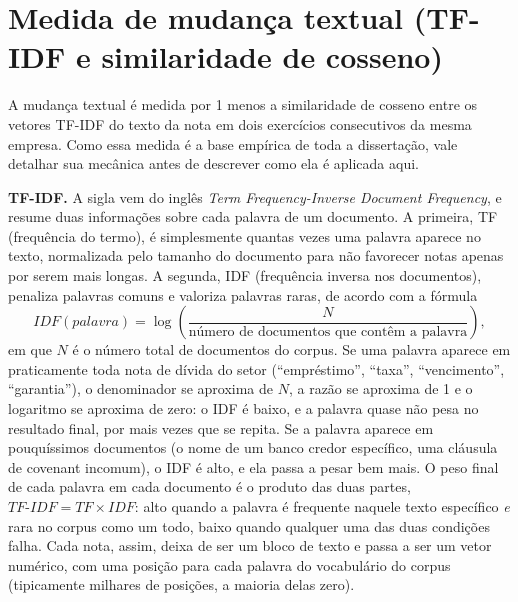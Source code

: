 \documentclass[a4paper,12pt]{report}
\begin{document}
\section{Medida de mudança textual (TF-IDF e similaridade de cosseno)}
\label{sec:medida}

A mudança textual é medida por 1 menos a similaridade de cosseno entre os vetores TF-IDF do texto da nota em dois exercícios consecutivos da mesma empresa. Como essa medida é a base empírica de toda a dissertação, vale detalhar sua mecânica antes de descrever como ela é aplicada aqui.

\textbf{TF-IDF.} A sigla vem do inglês \textit{Term Frequency-Inverse Document Frequency}, e resume duas informações sobre cada palavra de um documento. A primeira, TF (frequência do termo), é simplesmente quantas vezes uma palavra aparece no texto, normalizada pelo tamanho do documento para não favorecer notas apenas por serem mais longas. A segunda, IDF (frequência inversa nos documentos), penaliza palavras comuns e valoriza palavras raras, de acordo com a fórmula
\begin{equation}
    \mathit{IDF}(palavra) = \log\left(\frac{N}{\text{número de documentos que contêm a palavra}}\right),
    \label{eq:idf}
\end{equation}
em que $N$ é o número total de documentos do corpus. Se uma palavra aparece em praticamente toda nota de dívida do setor (``empréstimo'', ``taxa'', ``vencimento'', ``garantia''), o denominador se aproxima de $N$, a razão se aproxima de 1 e o logaritmo se aproxima de zero: o IDF é baixo, e a palavra quase não pesa no resultado final, por mais vezes que se repita. Se a palavra aparece em pouquíssimos documentos (o nome de um banco credor específico, uma cláusula de covenant incomum), o IDF é alto, e ela passa a pesar bem mais. O peso final de cada palavra em cada documento é o produto das duas partes, $\mathit{TF\text{-}IDF} = \mathit{TF} \times \mathit{IDF}$: alto quando a palavra é frequente naquele texto específico \emph{e} rara no corpus como um todo, baixo quando qualquer uma das duas condições falha. Cada nota, assim, deixa de ser um bloco de texto e passa a ser um vetor numérico, com uma posição para cada palavra do vocabulário do corpus (tipicamente milhares de posições, a maioria delas zero).
\end{document}
